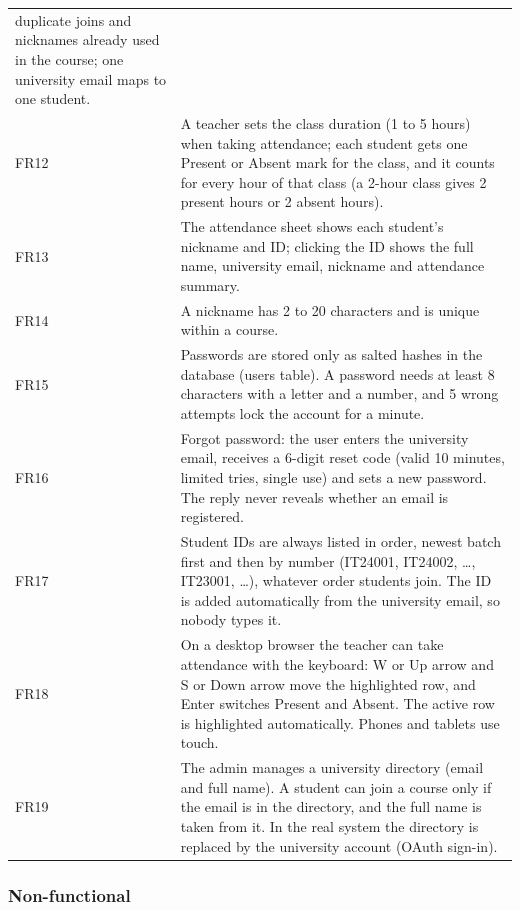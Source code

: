 \documentclass[
  11pt,
]{article}
\begin{document}
\begin{longtable}[]{@{}
  >{\raggedright\arraybackslash}p{}
  >{\raggedright\arraybackslash}p{}@{}}
duplicate joins and nicknames already used in the course; one university
email maps to one student. \\
FR12 & A teacher sets the class duration (1 to 5 hours) when taking
attendance; each student gets one Present or Absent mark for the class,
and it counts for every hour of that class (a 2-hour class gives 2
present hours or 2 absent hours). \\
FR13 & The attendance sheet shows each student's nickname and ID;
clicking the ID shows the full name, university email, nickname and
attendance summary. \\
FR14 & A nickname has 2 to 20 characters and is unique within a
course. \\
FR15 & Passwords are stored only as salted hashes in the database (users
table). A password needs at least 8 characters with a letter and a
number, and 5 wrong attempts lock the account for a minute. \\
FR16 & Forgot password: the user enters the university email, receives a
6-digit reset code (valid 10 minutes, limited tries, single use) and
sets a new password. The reply never reveals whether an email is
registered. \\
FR17 & Student IDs are always listed in order, newest batch first and
then by number (IT24001, IT24002, \ldots, IT23001, \ldots), whatever
order students join. The ID is added automatically from the university
email, so nobody types it. \\
FR18 & On a desktop browser the teacher can take attendance with the
keyboard: W or Up arrow and S or Down arrow move the highlighted row,
and Enter switches Present and Absent. The active row is highlighted
automatically. Phones and tablets use touch. \\
FR19 & The admin manages a university directory (email and full name). A
student can join a course only if the email is in the directory, and the
full name is taken from it. In the real system the directory is replaced
by the university account (OAuth sign-in). \\
\end{longtable}

\hypertarget{non-functional}{%
\subsubsection{Non-functional}\label{non-functional}}
\end{document}
